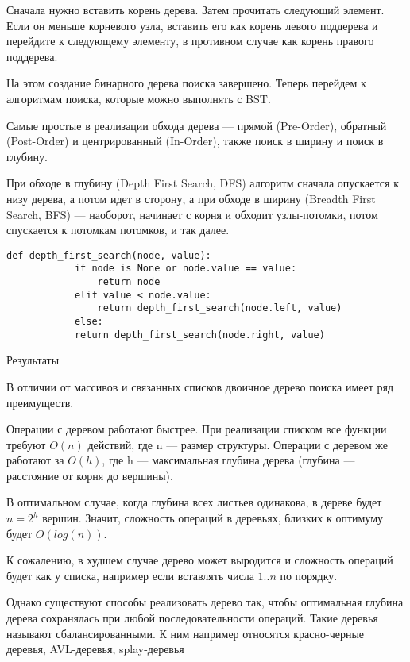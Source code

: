 \documentclass[oneside,14pt]{extarticle} %
\begin{document}
	Сначала нужно вставить корень дерева.
	Затем прочитать следующий элемент. Если он меньше корневого узла, вставить его как корень левого поддерева и перейдите к следующему элементу, в противном случае как корень правого поддерева.
	
	На этом создание бинарного дерева поиска завершено. Теперь перейдем к алгоритмам поиска, которые можно выполнять с BST.
	
	Самые простые в реализации обхода дерева — прямой (Pre-Order), обратный (Post-Order) и центрированный (In-Order), также поиск в ширину и поиск в глубину.
	
	При обходе в глубину (Depth First Search, DFS) алгоритм сначала опускается к низу дерева, а потом идет в сторону, а при обходе в ширину (Breadth First Search, BFS) — наоборот, начинает с корня и обходит узлы-потомки, потом спускается к потомкам потомков, и так далее.
	
	\begin{lstlisting}[caption={Алгоритм поиска в глубину}]
		def depth_first_search(node, value):
			if node is None or node.value == value:
				return node
			elif value < node.value:
				return depth_first_search(node.left, value)
			else:
			return depth_first_search(node.right, value)
	\end{lstlisting}
	
	
	\begin{center}
		Результаты
	\end{center}
		
	В отличии от массивов и связанных списков двоичное дерево поиска имеет ряд преимуществ.

	Операции с деревом работают быстрее. При реализации списком все функции требуют $O(n)$ действий, где n — размер структуры. Операции с деревом же работают за $O(h)$, где h — максимальная глубина дерева (глубина — расстояние от корня до вершины). 
	
	В оптимальном случае, когда глубина всех листьев одинакова, в дереве будет $n=2^h$ вершин. Значит, сложность операций в деревьях, близких к оптимуму будет $O(log(n))$. 
	
	К сожалению, в худшем случае дерево может выродится и сложность операций будет как у списка, например если вставлять числа $1..n$ по порядку.
	
	Однако существуют способы реализовать дерево так, чтобы оптимальная глубина дерева сохранялась при любой последовательности операций. Такие деревья называют сбалансированными. К ним например относятся красно-черные деревья, AVL-деревья, splay-деревья
	
\end{document}

